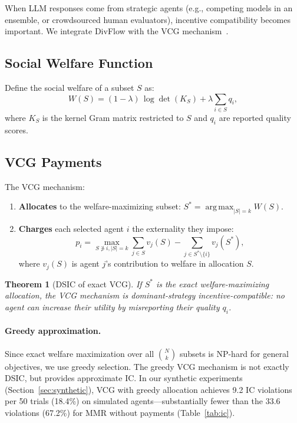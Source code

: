 \documentclass[10pt]{article}
\newtheorem{theorem}{Theorem}
\DeclareMathOperator*{\argmax}{arg\,max}
\begin{document}
When LLM responses come from strategic agents (e.g., competing models in an ensemble, or crowdsourced human evaluators), incentive compatibility becomes important.
We integrate DivFlow with the VCG mechanism~\citep{vickrey1961counterspeculation, clarke1971multipart, groves1973incentives}.

\subsection{Social Welfare Function}

Define the social welfare of a subset $S$ as:
\begin{equation}
W(S) = (1-\lambda)\, \log\det(K_S) + \lambda \sum_{i \in S} q_i,
\end{equation}
where $K_S$ is the kernel Gram matrix restricted to $S$ and $q_i$ are reported quality scores.

\subsection{VCG Payments}

The VCG mechanism:
\begin{enumerate}[leftmargin=*,itemsep=1pt]
  \item \textbf{Allocates} to the welfare-maximizing subset: $S^* = \argmax_{|S|=k} W(S)$.
  \item \textbf{Charges} each selected agent $i$ the externality they impose:
  \begin{equation}
  p_i = \max_{S \not\ni i, |S|=k} \sum_{j \in S} v_j(S) - \sum_{j \in S^* \setminus \{i\}} v_j(S^*),
  \end{equation}
  where $v_j(S)$ is agent $j$'s contribution to welfare in allocation $S$.
\end{enumerate}

\begin{theorem}[DSIC of exact VCG]
\label{thm:vcg}
If $S^*$ is the exact welfare-maximizing allocation, the VCG mechanism is dominant-strategy incentive-compatible: no agent can increase their utility by misreporting their quality $q_i$.
\end{theorem}

\paragraph{Greedy approximation.}
Since exact welfare maximization over all $\binom{N}{k}$ subsets is NP-hard for general objectives, we use greedy selection.
The greedy VCG mechanism is not exactly DSIC, but provides approximate IC.
In our synthetic experiments (Section~\ref{sec:synthetic}), VCG with greedy allocation achieves 9.2 IC violations per 50 trials (18.4\%) on simulated agents---substantially fewer than the 33.6 violations (67.2\%) for MMR without payments (Table~\ref{tab:ic}).
\end{document}
